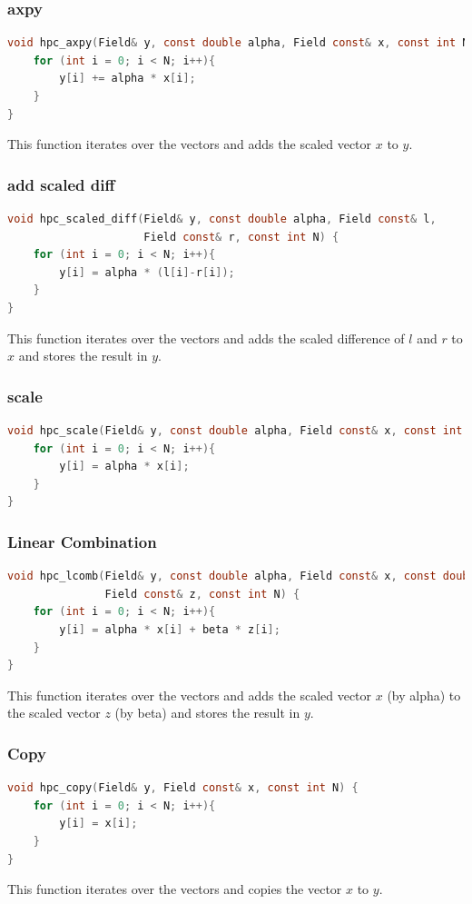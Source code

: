 \documentclass[unicode,11pt,a4paper,oneside,numbers=endperiod,openany]{scrartcl}
\begin{document}
\subsubsection{axpy}
\begin{lstlisting}[language=C]
  void hpc_axpy(Field& y, const double alpha, Field const& x, const int N) {
    for (int i = 0; i < N; i++){
        y[i] += alpha * x[i];
    }
}
\end{lstlisting}  
This function iterates over the vectors and adds the scaled vector $x$ to $y$.
\subsubsection{add scaled diff}
\begin{lstlisting}[language=C]
void hpc_scaled_diff(Field& y, const double alpha, Field const& l,
                     Field const& r, const int N) {
    for (int i = 0; i < N; i++){
        y[i] = alpha * (l[i]-r[i]);
    }
}
\end{lstlisting}  
This function iterates over the vectors and adds the scaled difference of $l$ and 
$r$ to $x$ and stores the result in $y$.

\subsubsection{scale}
\begin{lstlisting}[language=C]
void hpc_scale(Field& y, const double alpha, Field const& x, const int N) {
    for (int i = 0; i < N; i++){
        y[i] = alpha * x[i];
    }
}
\end{lstlisting}  

\subsubsection{Linear Combination}
\begin{lstlisting}[language=C]
void hpc_lcomb(Field& y, const double alpha, Field const& x, const double beta,
               Field const& z, const int N) {
    for (int i = 0; i < N; i++){
        y[i] = alpha * x[i] + beta * z[i];
    }
}
\end{lstlisting} 
This function iterates over the vectors and adds the scaled vector $x$ (by alpha) to the scaled vector $z$ 
(by beta) and stores the result in $y$.

\subsubsection{Copy}
\begin{lstlisting}[language=C]
void hpc_copy(Field& y, Field const& x, const int N) {
    for (int i = 0; i < N; i++){
        y[i] = x[i];
    }
}
\end{lstlisting} 
This function iterates over the vectors and copies the vector $x$ to $y$.
\end{document}
